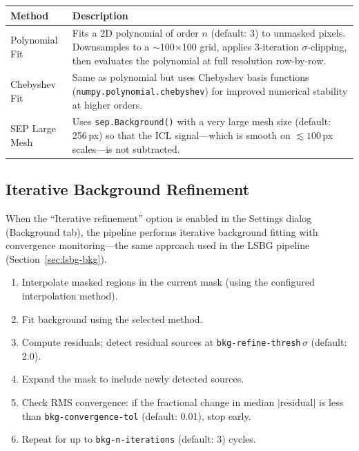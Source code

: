 \documentclass[11pt,fleqn]{book}
\begin{document}
\begin{center}
\begin{longtable}{L{3.5cm} L{9.0cm}}
\toprule
\textbf{Method} & \textbf{Description} \\
\midrule
\endhead
Polynomial Fit & Fits a 2D polynomial of order $n$ (default: 3) to unmasked pixels.  Downsamples to a $\sim$100$\times$100 grid, applies 3-iteration $\sigma$-clipping, then evaluates the polynomial at full resolution row-by-row. \\
\midrule
Chebyshev Fit & Same as polynomial but uses Chebyshev basis functions (\texttt{numpy.polynomial.chebyshev}) for improved numerical stability at higher orders. \\
\midrule
SEP Large Mesh & Uses \texttt{sep.Background()} with a very large mesh size (default: 256\,px) so that the ICL signal---which is smooth on $\lesssim 100$\,px scales---is not subtracted. \\
\bottomrule
\end{longtable}
\end{center}

\subsection{Iterative Background Refinement}

When the ``Iterative refinement'' option is enabled in the Settings dialog (Background tab), the pipeline performs iterative background fitting with convergence monitoring---the same approach used in the LSBG pipeline (Section~\ref{sec:lsbg-bkg}).

\begin{enumerate}[leftmargin=2em]
  \item Interpolate masked regions in the current mask (using the configured interpolation method).
  \item Fit background using the selected method.
  \item Compute residuals; detect residual sources at \texttt{bkg-refine-thresh}\,$\sigma$ (default: 2.0).
  \item Expand the mask to include newly detected sources.
  \item Check RMS convergence: if the fractional change in median $|\mathrm{residual}|$ is less than \texttt{bkg-convergence-tol} (default: 0.01), stop early.
  \item Repeat for up to \texttt{bkg-n-iterations} (default: 3) cycles.
\end{enumerate}
\end{document}
